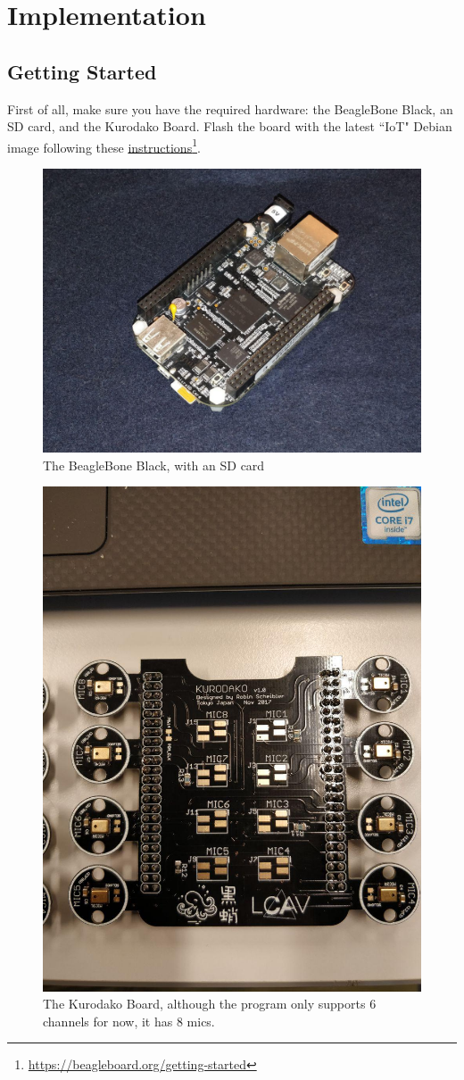 \documentclass[]{report}
\begin{document}
\hypertarget{implementation}{%
\chapter{Implementation}\label{implementation}}

\hypertarget{getting-started}{%
\section{Getting Started}\label{getting-started}}

First of all, make sure you have the required hardware: the BeagleBone
Black, an SD card, and the Kurodako Board. Flash the board with the
latest ``IoT" Debian image following these
\href{https://beagleboard.org/getting-started}{instructions}\footnote{\url{https://beagleboard.org/getting-started}}.

\begin{figure}[H]
\centering
\includegraphics[width=0.9\linewidth]{Pictures/BBB.jpg}
\caption{The BeagleBone Black, with an SD card}
\end{figure}

\begin{figure}[H]
\centering
\includegraphics[width=0.4\linewidth]{Pictures/kurodako.jpg}
\caption{The Kurodako Board, although the program only supports 6
channels for now, it has 8 mics.}
\end{figure}
\end{document}
